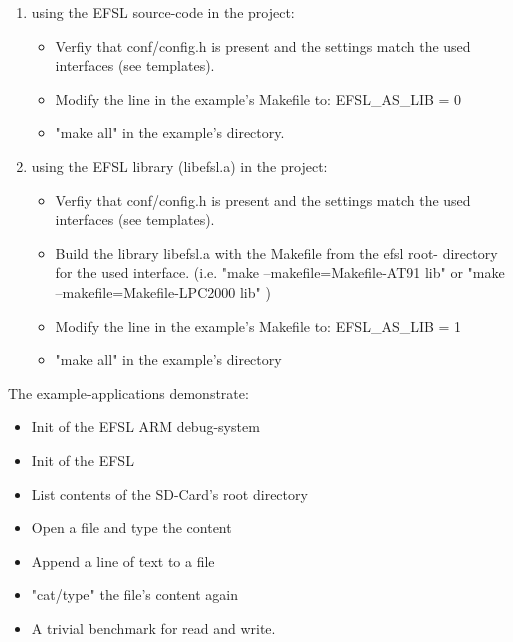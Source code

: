 \begin{enumerate}

\item using the EFSL source-code in the project:

	\begin{itemize}

\item Verfiy that conf/config.h is present
and the settings match the used 
interfaces (see templates).

\item Modify the line in the example's 
Makefile to: EFSL_AS_LIB = 0

\item "make all" in the example's directory.

	\end{itemize}


\item using the EFSL library (libefsl.a) in the project:

	\begin{itemize}

\item Verfiy that conf/config.h is present
and the settings match the used 
interfaces (see templates).

\item Build the library libefsl.a with
the Makefile from the efsl root-
directory for the used interface.
(i.e. "make --makefile=Makefile-AT91 lib" 
or "make --makefile=Makefile-LPC2000 lib" )

\item Modify the line in the example's 
Makefile to: EFSL\_AS\_LIB = 1

\item "make all" in the example's directory
	\end{itemize}

\end{enumerate}


The example-applications demonstrate:
	\begin{itemize}
\item Init of the EFSL ARM debug-system
\item Init of the EFSL
\item List contents of the SD-Card's
root directory
\item Open a file and type the content
\item Append a line of text to a file
\item "cat/type" the file's content again
\item A trivial benchmark for read and write.
	\end{itemize}

